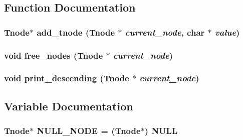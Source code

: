 \subsection{Function Documentation}
\subsubsection{\setlength{\rightskip}{0pt plus 5cm}\bf{Tnode}$\ast$ add\_\-tnode (\bf{Tnode} $\ast$ {\em current\_\-node}, char $\ast$ {\em value})}\label{tree_8h_b3161ce8e2e39e0bca7d1fc0babd9e38}


\subsubsection{\setlength{\rightskip}{0pt plus 5cm}void free\_\-nodes (\bf{Tnode} $\ast$ {\em current\_\-node})}\label{tree_8h_38f92de0257bd8aada7176be5ce35a08}


\subsubsection{\setlength{\rightskip}{0pt plus 5cm}void print\_\-descending (\bf{Tnode} $\ast$ {\em current\_\-node})}\label{tree_8h_b493eaa1755048d7ffe5884d4a3abdd9}




\subsection{Variable Documentation}
\subsubsection{\setlength{\rightskip}{0pt plus 5cm}\bf{Tnode}$\ast$ \bf{NULL\_\-NODE} = (\bf{Tnode}$\ast$) NULL\hspace{0.3cm}{\tt  [static]}}\label{tree_8h_e4653db799acb9d3ba01bccf01868acc}



